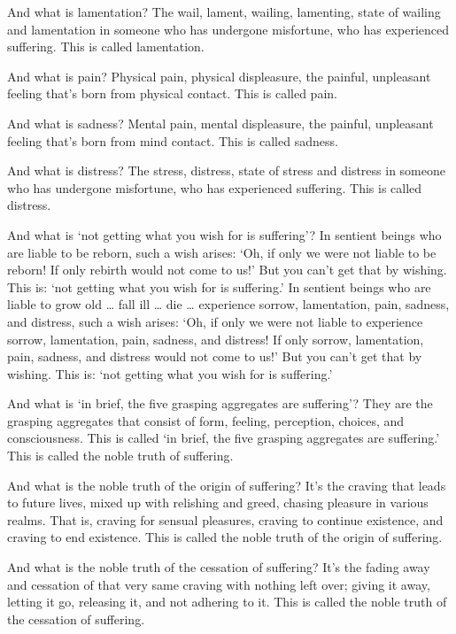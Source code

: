 \documentclass[12pt,openany]{book}%
\begin{document}
And what is lamentation? The wail, lament, wailing, lamenting, state of wailing and lamentation in someone who has undergone misfortune, who has experienced suffering. This is called lamentation. 

And what is pain? Physical pain, physical displeasure, the painful, unpleasant feeling that’s born from physical contact. This is called pain. 

And what is sadness? Mental pain, mental displeasure, the painful, unpleasant feeling that’s born from mind contact. This is called sadness. 

And what is distress? The stress, distress, state of stress and distress in someone who has undergone misfortune, who has experienced suffering. This is called distress. 

And what is ‘not getting what you wish for is suffering’? In sentient beings who are liable to be reborn, such a wish arises: ‘Oh, if only we were not liable to be reborn! If only rebirth would not come to us!’ But you can’t get that by wishing. This is: ‘not getting what you wish for is suffering.’ In sentient beings who are liable to grow old … fall ill … die … experience sorrow, lamentation, pain, sadness, and distress, such a wish arises: ‘Oh, if only we were not liable to experience sorrow, lamentation, pain, sadness, and distress! If only sorrow, lamentation, pain, sadness, and distress would not come to us!’ But you can’t get that by wishing. This is: ‘not getting what you wish for is suffering.’ 

And what is ‘in brief, the five grasping aggregates are suffering’? They are the grasping aggregates that consist of form, feeling, perception, choices, and consciousness. This is called ‘in brief, the five grasping aggregates are suffering.’ This is called the noble truth of suffering. 

And what is the noble truth of the origin of suffering? It’s the craving that leads to future lives, mixed up with relishing and greed, chasing pleasure in various realms. That is, craving for sensual pleasures, craving to continue existence, and craving to end existence. This is called the noble truth of the origin of suffering. 

And what is the noble truth of the cessation of suffering? It’s the fading away and cessation of that very same craving with nothing left over; giving it away, letting it go, releasing it, and not adhering to it. This is called the noble truth of the cessation of suffering. 
\end{document}
